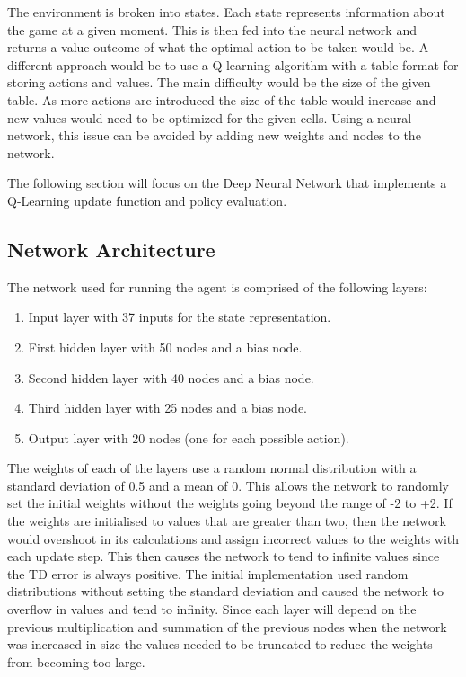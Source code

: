 The environment is broken into states. Each state represents information about
the game at a given moment. This is then fed into the neural network and
returns a value outcome of what the optimal action to be taken would be. A
different approach would be to use a Q-learning algorithm with a table format
for storing actions and values. The main difficulty would be the size of the
given table. As more actions are introduced the size of the table would
increase and new values would need to be optimized for the given cells. Using a
neural network, this issue can be avoided by adding new weights and nodes to the
network.

The following section will focus on the Deep Neural Network that implements a
Q-Learning update function and policy evaluation.

\subsection{Network Architecture}

The network used for running the agent is comprised of the following layers:

\begin{enumerate}
    \item Input layer with 37 inputs for the state representation.
    \item First hidden layer with 50 nodes and a bias node.
    \item Second hidden layer with 40 nodes and a bias node.
    \item Third hidden layer with 25 nodes and a bias node.
    \item Output layer with 20 nodes (one for each possible action).
\end{enumerate}

The weights of each of the layers use a random normal distribution with a
standard deviation of 0.5 and a mean of 0. This allows the network to randomly
set the initial weights without the weights going beyond the range of -2 to +2.
If the weights are initialised to values that are greater than two, then the
network would overshoot in its calculations and assign incorrect values to the
weights with each update step. This then causes the network to tend to infinite
values since the TD error is always positive. The initial implementation used
random distributions without setting the standard deviation and caused the
network to overflow in values and tend to infinity. Since each layer will depend
on the previous multiplication and summation of the previous nodes when the
network was increased in size the values needed to be truncated to reduce the
weights from becoming too large.

